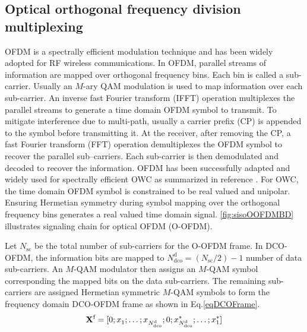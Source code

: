 \subsection{Optical orthogonal frequency division multiplexing}
\label{subsec:sisoModulationOOFDM}
OFDM is a spectrally efficient modulation technique and has been widely adopted for RF wireless communications. In OFDM, parallel streams of information are mapped over orthogonal frequency bins. Each bin is called a sub-carrier. Usually an $M$-ary QAM modulation is used to map information over each sub-carrier. An inverse fast Fourier transform (IFFT) operation multiplexes the parallel streams to generate a time domain OFDM symbol to transmit. To mitigate interference due to multi-path, usually a carrier prefix (CP) is appended to the symbol before transmitting it. At the receiver, after removing the CP, a fast Fourier transform (FFT) operation demultiplexes the OFDM symbol to recover the parallel sub--carriers. Each sub-carrier is then demodulated and decoded to recover the information. OFDM has been successfully adapted and widely used for spectrally efficient OWC as summarized in reference \cite{arm09a}. For OWC, the time domain OFDM symbol is constrained to be real valued and unipolar. Ensuring Hermetian symmetry during symbol mapping over the orthogonal frequency bins generates a real valued time domain signal. \figurename{ \ref{fig:sisoOOFDMBD}} illustrates signaling chain for optical OFDM (O-OFDM). 


Let $N_{\text{sc}}$ be the total number of sub-carriers for the O-OFDM frame. In DCO-OFDM,  the information bits are mapped to $N_{\text{dco}}^{\text{d}} = (N_{\text{sc}}/2) - 1$ number of data sub-carriers. An $M$-QAM modulator then assigns an $M$-QAM symbol corresponding the mapped bits on the data sub-carriers. The remaining sub-carriers are assigned Hermetian symmetric $M$-QAM symbols to form the frequency domain DCO-OFDM frame as shown in Eq.\eqref{eqDCOFrame}. 
\begin{equation}
	{\bf{X}}^{\text{f}} = [0; x_{1}^{ }; \ldots; x_{N_{\text{dco}}^{\text{d}}}^{ }; 0; x_{N_{\text{dco}}^{\text{d}}}^{*}; \ldots; x_{1}^{*}]
\label{eqDCOFrame}
\end{equation}

